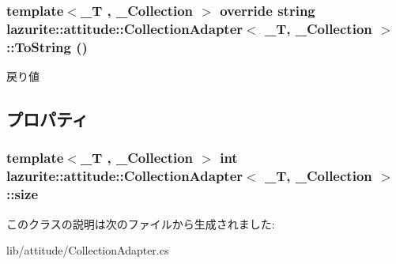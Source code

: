 \hypertarget{classlazurite_1_1attitude_1_1_collection_adapter_3_01___t_00_01___collection_01_4_a593935e53ce96be4af7f5f563524ca02}{
\subsubsection[{ToString}]{\setlength{\rightskip}{0pt plus 5cm}template$<$\_\-T , \_\-Collection $>$ override string lazurite::attitude::CollectionAdapter$<$ \_\-T, \_\-Collection $>$::ToString ()}}
\label{classlazurite_1_1attitude_1_1_collection_adapter_3_01___t_00_01___collection_01_4_a593935e53ce96be4af7f5f563524ca02}
\begin{DoxyReturn}{戻り値}

\end{DoxyReturn}


\subsection{プロパティ}
\hypertarget{classlazurite_1_1attitude_1_1_collection_adapter_3_01___t_00_01___collection_01_4_af83328925da0e124e09bcc013fa9f2f1}{
\subsubsection[{size}]{\setlength{\rightskip}{0pt plus 5cm}template$<$\_\-T , \_\-Collection $>$ int lazurite::attitude::CollectionAdapter$<$ \_\-T, \_\-Collection $>$::size}}
\label{classlazurite_1_1attitude_1_1_collection_adapter_3_01___t_00_01___collection_01_4_af83328925da0e124e09bcc013fa9f2f1}


このクラスの説明は次のファイルから生成されました:\begin{DoxyCompactItemize}
\item 
lib/attitude/CollectionAdapter.cs\end{DoxyCompactItemize}
